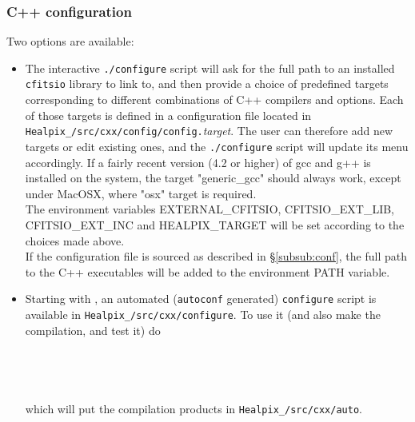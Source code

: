 \documentclass[12pt,twoside]{article}
\begin{document}
\subsubsection{C++ configuration}
\label{sec:cpp_config}
Two options are available:
\begin{itemize}
\item The interactive \texttt{./configure} script will 
ask for the full path to an installed \texttt{cfitsio} library to link to, and then provide a choice of
predefined targets corresponding to different combinations of C++ compilers and
options. Each of those targets is defined in a configuration file located in
\texttt{Healpix\_\hpxversion/src/cxx/config/config.}{\em target}.
The user can therefore add new targets or edit existing ones, and the
\texttt{./configure} script will update its menu accordingly.
If a fairly recent version
(4.2 or higher) of gcc and g++ is installed on the system, the target
"generic\_gcc" should always work, except under MacOSX, where "osx" target is
required.  \\
The environment variables EXTERNAL\_CFITSIO, 
CFITSIO\_EXT\_LIB, 
CFITSIO\_EXT\_INC and 
HEALPIX\_TARGET 
will be set according to the choices made above.
\\
If the \healpix configuration file is sourced as described in \S\ref{subsub:conf}, the full path to the C++
executables will be added to the environment PATH variable.

\item Starting with , an automated (\texttt{autoconf} generated) \texttt{configure} script is 
available in \texttt{Healpix\_\hpxversion/src/cxx/configure}. To use it (and also make the compilation, and test it) 
do\\
\\
\\
\\
\\
which will put the compilation products in \texttt{Healpix\_\hpxversion/src/cxx/auto}.
\end{itemize}
\end{document}
